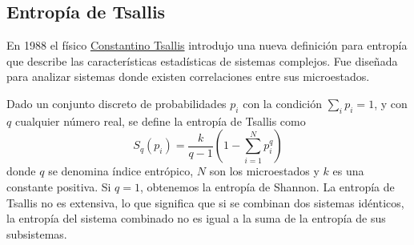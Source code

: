 \subsection{Entropía de Tsallis}
En 1988 el físico \href{https://en.wikipedia.org/wiki/Constantino_Tsallis}{Constantino Tsallis} 
introdujo una nueva definición para entropía que describe las características estadísticas de sistemas 
complejos. Fue diseñada para analizar sistemas donde existen correlaciones entre sus microestados.\cite{tsallis}
\begin{definicion}\label{def:tsallis_entropy}
Dado un conjunto discreto de probabilidades ${p_i}$ con la condición $\sum_{i} p_i = 1$, y con $q$ 
cualquier número real, se define la entropía de Tsallis como
$$ S_q(p_i)=\frac{k}{q-1}(1- \sum_{i=1}^{N}p_{i}^{q})$$
donde $q$ se denomina índice entrópico, $N$ son los microestados y $k$ es una constante positiva. Si $q = 1$, obtenemos la entropía de 
Shannon. La entropía de Tsallis no es extensiva, lo que significa que si se combinan dos sistemas idénticos, 
la entropía del sistema combinado no es igual a la suma de la entropía de sus subsistemas.\cite{comparison-entropies}
\end{definicion}


